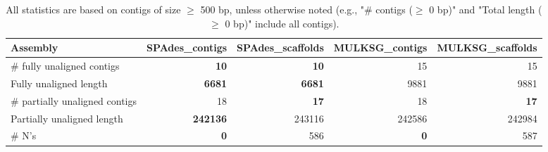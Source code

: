 \documentclass[12pt,a4paper]{article}
\begin{document}
\begin{table}[ht]
\begin{center}
\caption{All statistics are based on contigs of size $\geq$ 500 bp, unless otherwise noted (e.g., "\# contigs ($\geq$ 0 bp)" and "Total length ($\geq$ 0 bp)" include all contigs).}
\begin{tabular}{|l*{4}{|r}|}
\hline
Assembly & SPAdes\_contigs & SPAdes\_scaffolds & MULKSG\_contigs & MULKSG\_scaffolds \\ \hline
\# fully unaligned contigs & {\bf 10} & {\bf 10} & 15 & 15 \\ \hline
Fully unaligned length & {\bf 6681} & {\bf 6681} & 9881 & 9881 \\ \hline
\# partially unaligned contigs & 18 & {\bf 17} & 18 & {\bf 17} \\ \hline
Partially unaligned length & {\bf 242136} & 243116 & 242586 & 242984 \\ \hline
\# N's & {\bf 0} & 586 & {\bf 0} & 587 \\ \hline
\end{tabular}
\end{center}
\end{table}
\end{document}
